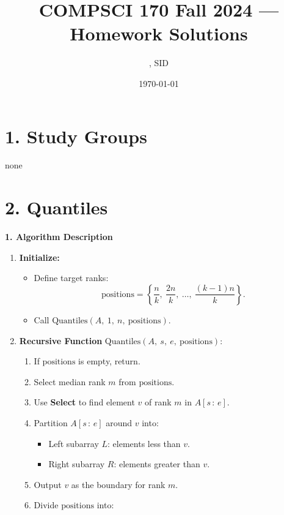\documentclass[11pt]{article}
\title{COMPSCI 170 Fall 2024 --- Homework \Homework Solutions}
\author{\Name, SID \SID}
\date{\today}
\begin{document}
\maketitle

\section*{1. Study Groups}

none



\newpage
\section*{2. Quantiles}
\textbf{1. Algorithm Description}

\begin{enumerate}
    \item \textbf{Initialize:}
        \begin{itemize}
            \item Define target ranks:
                \[
                \text{positions} = \left\{ \frac{n}{k},\ \frac{2n}{k},\ \dots,\ \frac{(k - 1)n}{k} \right\}.
                \]
            \item Call \(\text{Quantiles}(A,\ 1,\ n,\ \text{positions})\).
        \end{itemize}
    \item \textbf{Recursive Function} \(\text{Quantiles}(A,\ s,\ e,\ \text{positions})\):
        \begin{enumerate}
            \item If \(\text{positions}\) is empty, return.
            \item Select median rank \(m\) from \(\text{positions}\).
            \item Use \textbf{Select} to find element \(v\) of rank \(m\) in \(A[s\,:\,e]\).
            \item Partition \(A[s\,:\,e]\) around \(v\) into:
                \begin{itemize}
                    \item Left subarray \(L\): elements less than \(v\).
                    \item Right subarray \(R\): elements greater than \(v\).
                \end{itemize}
            \item Output \(v\) as the boundary for rank \(m\).
            \item Divide \(\text{positions}\) into:

\end{enumerate}
\end{enumerate}
\end{document}
